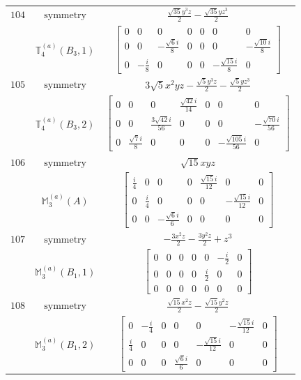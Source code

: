 \documentclass[fleqn,8pt,landscape]{jsarticle}
\begin{document}
\begin{longtable}{ccc}
$ 104 $ & $ \text{symmetry} $ & $ \frac{\sqrt{35} y^{3} z}{2} - \frac{\sqrt{35} y z^{3}}{2} $ \\
$  $ & $ \mathbb{T}_{4}^{(a)}(B_{3},1) $ & $ \begin{bmatrix} 0 & 0 & 0 & 0 & 0 & 0 & 0 \\ 0 & 0 & - \frac{\sqrt{6} i}{8} & 0 & 0 & 0 & - \frac{\sqrt{10} i}{8} \\ 0 & - \frac{i}{8} & 0 & 0 & 0 & - \frac{\sqrt{15} i}{8} & 0 \end{bmatrix} $ \\ \hline
$ 105 $ & $ \text{symmetry} $ & $ 3 \sqrt{5} x^{2} y z - \frac{\sqrt{5} y^{3} z}{2} - \frac{\sqrt{5} y z^{3}}{2} $ \\
$  $ & $ \mathbb{T}_{4}^{(a)}(B_{3},2) $ & $ \begin{bmatrix} 0 & 0 & 0 & \frac{\sqrt{42} i}{14} & 0 & 0 & 0 \\ 0 & 0 & \frac{3 \sqrt{42} i}{56} & 0 & 0 & 0 & - \frac{\sqrt{70} i}{56} \\ 0 & \frac{\sqrt{7} i}{8} & 0 & 0 & 0 & - \frac{\sqrt{105} i}{56} & 0 \end{bmatrix} $ \\ \hline
$ 106 $ & $ \text{symmetry} $ & $ \sqrt{15} x y z $ \\
$  $ & $ \mathbb{M}_{3}^{(a)}(A) $ & $ \begin{bmatrix} \frac{i}{4} & 0 & 0 & 0 & \frac{\sqrt{15} i}{12} & 0 & 0 \\ 0 & \frac{i}{4} & 0 & 0 & 0 & - \frac{\sqrt{15} i}{12} & 0 \\ 0 & 0 & - \frac{\sqrt{6} i}{6} & 0 & 0 & 0 & 0 \end{bmatrix} $ \\ \hline
$ 107 $ & $ \text{symmetry} $ & $ - \frac{3 x^{2} z}{2} - \frac{3 y^{2} z}{2} + z^{3} $ \\
$  $ & $ \mathbb{M}_{3}^{(a)}(B_{1},1) $ & $ \begin{bmatrix} 0 & 0 & 0 & 0 & 0 & - \frac{i}{2} & 0 \\ 0 & 0 & 0 & 0 & \frac{i}{2} & 0 & 0 \\ 0 & 0 & 0 & 0 & 0 & 0 & 0 \end{bmatrix} $ \\ \hline
$ 108 $ & $ \text{symmetry} $ & $ \frac{\sqrt{15} x^{2} z}{2} - \frac{\sqrt{15} y^{2} z}{2} $ \\
$  $ & $ \mathbb{M}_{3}^{(a)}(B_{1},2) $ & $ \begin{bmatrix} 0 & - \frac{i}{4} & 0 & 0 & 0 & - \frac{\sqrt{15} i}{12} & 0 \\ \frac{i}{4} & 0 & 0 & 0 & - \frac{\sqrt{15} i}{12} & 0 & 0 \\ 0 & 0 & 0 & \frac{\sqrt{6} i}{6} & 0 & 0 & 0 \end{bmatrix} $ \\ \hline

\end{longtable}
\end{document}
